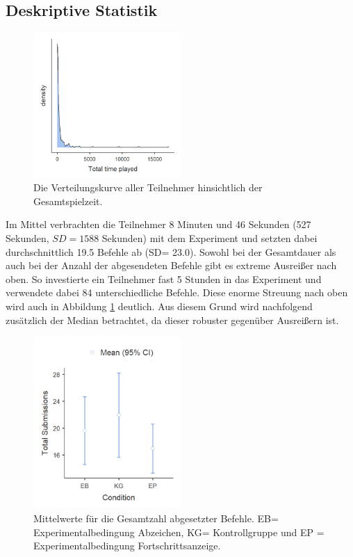 \subsection{Deskriptive Statistik}

\begin{figure}[htbp]
    \centering
    \includegraphics[width=0.5\textwidth]{img/auswertung/density.png}
    \caption{Die Verteilungskurve aller Teilnehmer hinsichtlich der Gesamtspielzeit.}
    \label{density}
\end{figure}

Im Mittel verbrachten die Teilnehmer 8 Minuten und 46 Sekunden (527 Sekunden, $SD = 1588$ Sekunden) mit dem Experiment und setzten dabei durchschnittlich 19.5 Befehle ab (SD= 23.0). Sowohl bei der Gesamtdauer als auch bei der Anzahl der abgesendeten Befehle gibt es extreme Ausreißer nach oben. So investierte ein Teilnehmer fast 5 Stunden in das Experiment und verwendete dabei 84 unterschiedliche Befehle. Diese enorme Streuung nach oben wird auch in Abbildung \ref{density} deutlich. Aus diesem Grund wird nachfolgend zusätzlich der Median betrachtet, da dieser robuster gegenüber Ausreißern ist.

\begin{figure}[htbp]
    \centering
    \includegraphics[width=0.5\textwidth]{img/auswertung/mean_subs.png}
    \caption{Mittelwerte für die Gesamtzahl abgesetzter Befehle. EB= Experimentalbedingung Abzeichen, KG= Kontrollgruppe und EP = Experimentalbedingung Fortschrittsanzeige.}
    \label{mean_subs}
\end{figure}

